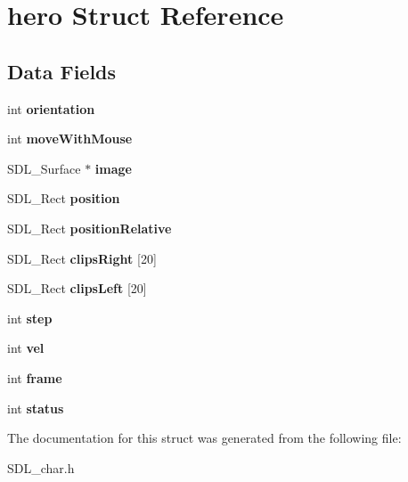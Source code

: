 \hypertarget{structhero}{}\section{hero Struct Reference}
\label{structhero}
\subsection*{Data Fields}
\begin{DoxyCompactItemize}
\item 
\mbox{\label{structhero_aeec4ea52e8f6b9f1a0b45d8219210da1}} 
int {\bfseries orientation}
\item 
\mbox{\label{structhero_a97ebbee1d5278dd8b9079b96d1603588}} 
int {\bfseries move\+With\+Mouse}
\item 
\mbox{\label{structhero_aed2e9c21cff3178bfb3253b278221f5d}} 
S\+D\+L\+\_\+\+Surface $\ast$ {\bfseries image}
\item 
\mbox{\label{structhero_a0bacee409a7f3adbb86669712a83ec31}} 
S\+D\+L\+\_\+\+Rect {\bfseries position}
\item 
\mbox{\label{structhero_a3b8e1b3b93eb28871f9b03e360857ec4}} 
S\+D\+L\+\_\+\+Rect {\bfseries position\+Relative}
\item 
\mbox{\label{structhero_ae19015eb476dc86aea435dfa53b46905}} 
S\+D\+L\+\_\+\+Rect {\bfseries clips\+Right} \mbox{[}20\mbox{]}
\item 
\mbox{\label{structhero_a0f3354c05816a6a55208c1ff7ece036f}} 
S\+D\+L\+\_\+\+Rect {\bfseries clips\+Left} \mbox{[}20\mbox{]}
\item 
\mbox{\label{structhero_a8ac297ec48dd04afbf3c8bebd513eb0a}} 
int {\bfseries step}
\item 
\mbox{\label{structhero_af1040b37d461b8ebee7143a9361bc986}} 
int {\bfseries vel}
\item 
\mbox{\label{structhero_a8affba68a94772ef439a2ee68b244ff8}} 
int {\bfseries frame}
\item 
\mbox{\label{structhero_a8b17e22b91882ecdd12171b68d512d04}} 
int {\bfseries status}
\end{DoxyCompactItemize}


The documentation for this struct was generated from the following file\+:\begin{DoxyCompactItemize}
\item 
S\+D\+L\+\_\+char.\+h\end{DoxyCompactItemize}
